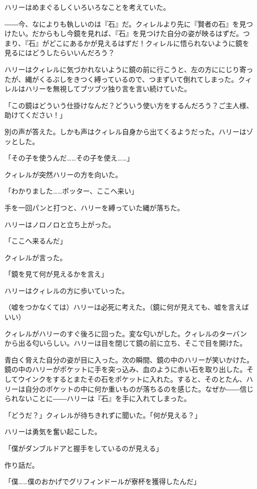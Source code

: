 \documentclass[10pt,a4paper]{article}
\begin{document}
\begin{CJK}{UTF8}{min}
ハリーはめまぐるしくいろいろなことを考えていた。

――今、なによりも執しいのは『石』だ。クィレルより先に『賢者の石』を見つけたい。だからもし今鏡を見れば、『石』を見つけた自分の姿が映るはずだ。つまり、『石』がどこにあるかが見えるはずだ！クィレルに悟られないように鏡を見るにはどうしたらいいんだろう？

ハリーはクィレルに気づかれないように鏡の前に行こうと、左の方ににじり寄ったが、縄がくるぶしをきつく縛っているので、つまずいて倒れてしまった。クィレルはハリーを無視してブツブツ独り言を言い続けていた。

「この鏡はどういう仕掛けなんだ？どういう使い方をするんだろう？ご主人様、助けてください！」

別の声が答えた。しかも声はクィレル自身から出てくるようだった。ハリーはゾッとした。

「その子を使うんだ……その子を使え……」

クィレルが突然ハリーの方を向いた。

「わかりました……ポッター、ここへ来い」

手を一回パンと打つと、ハリーを縛っていた縄が落ちた。

ハリーはノロノロと立ち上がった。

「ここへ来るんだ」

クィレルが言った。

「鏡を見て何が見えるかを言え」



ハリーはクィレルの方に歩いていった。

（嘘をつかなくては）ハリーは必死に考えた。（鏡に何が見えても、嘘を言えばいい）

クィレルがハリーのすぐ後ろに回った。変な匂いがした。クィレルのターバンから出る匂いらしい。ハリーは目を閉じて鏡の前に立ち、そこで目を開けた。

青白く脅えた自分の姿が目に入った。次の瞬間、鏡の中のハリーが笑いかけた。鏡の中のハリーがポケットに手を突っ込み、血のように赤い石を取り出した。そしてウインクをするとまたその石をポケットに入れた。すると、そのとたん、ハリーは自分のポケットの中に何か重いものが落ちるのを感じた。なぜか――信じられないことに――ハリーは『石』を手に入れてしまった。

「どうだ？」クィレルが待ちきれずに聞いた。「何が見える？」

ハリーは勇気を奮い起こした。

「僕がダンブルドアと握手をしているのが見える」

作り話だ。

「僕……僕のおかげでグリフィンドールが寮杯を獲得したんだ」


\end{CJK}
\end{document}
